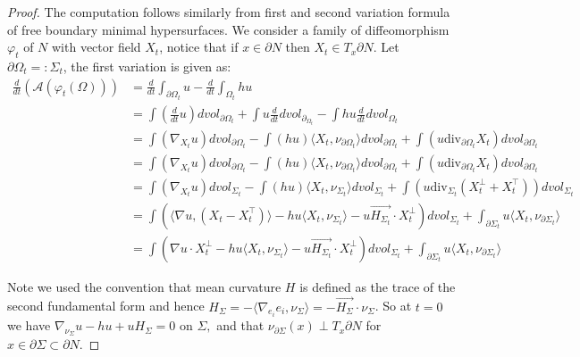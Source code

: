 \documentclass[10pt,a4paper]{amsart}
\newcommand{\dive}{\text{div}}
\begin{document}
	\begin{proof}
		The computation follows similarly from first and second variation formula of free boundary minimal hypersurfaces.
		We consider a family of diffeomorphism $\varphi_t$ of $N$ with vector field $X_t$, notice that if $x \in \partial N$ then $X_t \in T_x \partial N$. Let $\partial \Omega_t =:\Sigma_t$, the first variation is given as:
		\begin{align*}
			\frac{d}{dt}(\mathcal{A}(\varphi_t(\Omega)))&=\frac{d}{dt} \int_{\partial \Omega_t} u - \frac{d}{dt}\int_{\Omega_t} hu\\
			&=\int (\frac{d}{dt}u)dvol_{\partial \Omega_t}+ \int u \frac{d}{dt} dvol_{\partial_{\Omega_t}} - \int hu \frac{d}{dt} dvol_{\Omega_t}\\
			&= \int (\nabla_{X_t} u) dvol_{\partial \Omega_t} -\int (hu) \langle X_t, \nu_{\partial \Omega_t}\rangle dvol_{\partial \Omega_t} + \int (u \dive_{\partial \Omega_t} X_t) dvol_{\partial \Omega_t} \\
			&= \int (\nabla_{X_t} u) dvol_{\partial \Omega_t}  -\int (hu)\langle X_t, \nu_{\partial \Omega_t}\rangle  dvol_{\partial \Omega_t}+\int (u \dive_{\partial \Omega_t} X_t) dvol_{\partial \Omega_t}\\
			&=\int (\nabla_{X_t} u) dvol_{\Sigma_t}  -\int (hu) \langle X_t, \nu_{\Sigma_t}\rangle dvol_{\Sigma_t}+ \int (u \dive_{\Sigma_t} (X^{\perp}_t+X^{\top}_t)) dvol_{\Sigma_t}\\
			&=\int (\langle \nabla u, (X_t-X^{\top}_t)\rangle - hu\langle X_t, \nu_{\Sigma_t}\rangle-u\vec{H_{\Sigma_t}}\cdot X^{\perp}_t ) dvol_{\Sigma_t}+\int_{\partial \Sigma_t} u \langle X_t, \nu_{\partial \Sigma_t}\rangle \\
			&= \int (\nabla u \cdot X^{\perp}_t -hu\langle X_t, \nu_{\Sigma_t}\rangle-u\vec{H_{\Sigma_t}}\cdot X^{\perp}_t ) dvol_{\Sigma_t} + \int_{\partial \Sigma_t} u \langle X_t, \nu_{\partial \Sigma_t}\rangle
		\end{align*}

		Note we used the convention that mean curvature $H$ is defined as the trace of the second fundamental form and hence $H_{\Sigma}=-\langle\nabla_{e_i} e_i,\nu_{\Sigma}\rangle=-\vec{H_{\Sigma}}\cdot \nu_{\Sigma}$.
		So at $t=0$ we have $\nabla_{\nu_{\Sigma}} u-hu+uH_{\Sigma} =0$ on $\Sigma,$ and that $\nu_{\partial \Sigma} (x) \perp T_x\partial N$ for $x \in \partial \Sigma \subset \partial N.$


\end{proof}
\end{document}
